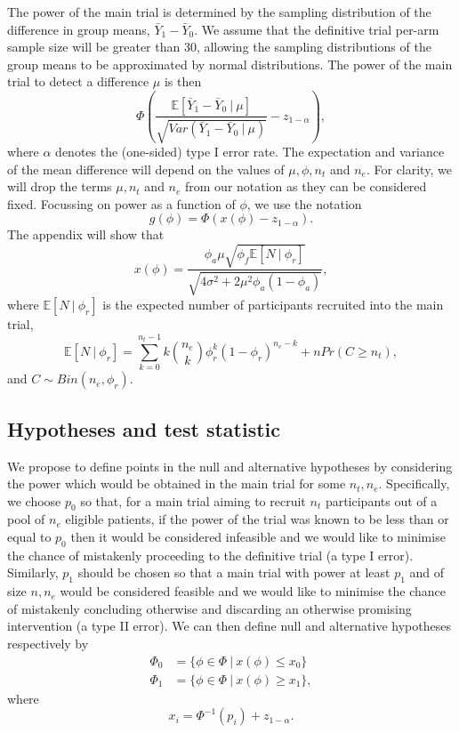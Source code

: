 \documentclass[AMA,STIX1COL]{WileyNJD-v2}
\begin{document}
The power of the main trial is determined by the sampling distribution of the difference in group means, $\bar{Y}_1 - \bar{Y}_0$. We assume that the definitive trial per-arm sample size will be greater than 30, allowing the sampling distributions of the group means to be approximated by normal distributions. The power of the main trial to detect a difference $\mu$ is then
$$
\Phi \left(\frac{\mathbb{E}[\bar{Y}_1 - \bar{Y}_0 ~|~ \mu]}{\sqrt{Var(\bar{Y}_1 - \bar{Y}_0 ~|~ \mu)}} - z_{1-\alpha} \right),
$$
where $\alpha$ denotes the (one-sided) type I error rate. The expectation and variance of the mean difference will depend on the values of $\mu, \phi, n_t$ and $n_e$. For clarity, we will drop the terms $\mu, n_t$ and $n_e$ from our notation as they can be considered fixed. Focussing on power as a function of $\phi$, we use the notation
$$
g(\phi) = \Phi \left( x(\phi) - z_{1-\alpha} \right).
$$
The appendix will show that
$$
x(\phi) =  \frac{ \phi_a\mu \sqrt{\phi_f \mathbb{E}[N ~|~ \phi_r]} } {\sqrt{4\sigma^2 + 2 \mu^2 \phi_a(1-\phi_a)}},
$$
where $\mathbb{E}[N ~|~ \phi_r]$ is the expected number of participants recruited into the main trial,
$$
\mathbb{E}[N ~|~ \phi_r] = \sum_{k=0}^{n_t-1} k{n_e \choose k} \phi_r^k (1-\phi_r)^{n_e - k} + n Pr(C \geq n_t),
$$
and $C \sim Bin(n_e, \phi_r)$.

\subsection{Hypotheses and test statistic}

We propose to define points in the null and alternative hypotheses by considering the power which would be obtained in the main trial for some $n_t, n_e$. Specifically, we choose $p_0$ so that, for a main trial aiming to recruit $n_t$ participants out of a pool of $n_e$ eligible patients, if the power of the trial was known to be less than or equal to $p_0$ then it would be considered infeasible and we would like to minimise the chance of mistakenly proceeding to the definitive trial (a type I error). Similarly, $p_1$ should be chosen so that a main trial with power at least $p_1$ and of size $n, n_e$ would be considered feasible and we would like to minimise the chance of mistakenly concluding otherwise and discarding an otherwise promising intervention (a type II error). We can then define null and alternative hypotheses respectively by
\begin{align*}
\Phi_0 &= \{\phi \in \Phi ~ | ~ x(\phi) \leq x_0 \} \\
\Phi_1 &= \{\phi \in \Phi ~ | ~ x(\phi) \geq x_1 \},
\end{align*}
where
$$
x_i = \Phi^{-1}(p_i) + z_{1-\alpha}.
$$
\end{document}
